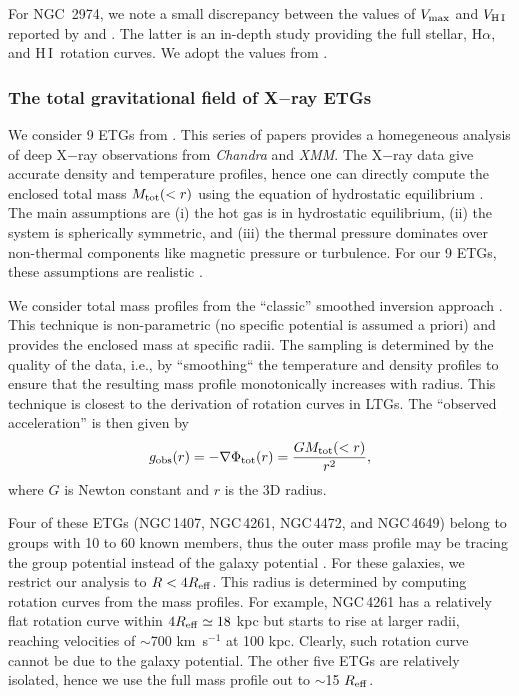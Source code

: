 \documentclass[apjl, twocolappendix]{emulateapj}
\newcommand{\hi } {{\rm H}\,{\small\rm I} \,}
\begin{document}
For NGC~2974, we note a small discrepancy between the values of $V_{\rm max}$ and $V_{\hi}$ reported by \citet{Serra2016} and \citet{Weijmans2008}. The latter is an in-depth study providing the full stellar, H$\alpha$, and \hi rotation curves. We adopt the values from \citet{Weijmans2008}.

\subsubsection{The total gravitational field of X$-$ray ETGs}\label{sec:XrayETGs}

We consider 9 ETGs from \citet{Humphrey2006, Humphrey2008, Humphrey2009, Humphrey2011, Humphrey2012}. This series of papers provides a homegeneous analysis of deep X$-$ray observations from \emph{Chandra} and \emph{XMM}. The X$-$ray data give accurate density and temperature profiles, hence one can directly compute the enclosed total mass $M_{\rm tot}(<r)$ using the equation of hydrostatic equilibrium \citep[see][for a review]{Buote2012}. The main assumptions are (i) the hot gas is in hydrostatic equilibrium, (ii) the system is spherically symmetric, and (iii) the thermal pressure dominates over non-thermal components like magnetic pressure or turbulence. For our 9 ETGs, these assumptions are realistic \citep{Buote2012}. 

We consider total mass profiles from the ``classic'' smoothed inversion approach \citep[see][]{Buote2012}. This technique is non-parametric (no specific potential is assumed a priori) and provides the enclosed mass at specific radii. The sampling is determined by the quality of the data, i.e., by ``smoothing`` the temperature and density profiles to ensure that the resulting mass profile monotonically increases with radius. This technique is closest to the derivation of rotation curves in LTGs. The ``observed acceleration'' is then given by
\begin{equation}\label{Eq:dSph2}
 g_{\rm obs}(r) = -\nabla\Phi_{\rm tot}(r) = \dfrac{G M_{\rm tot}(<r)}{r^2},
\end{equation}
where $G$ is Newton constant and $r$ is the 3D radius.

Four of these ETGs (NGC\,1407, NGC\,4261, NGC\,4472, and NGC\,4649) belong to groups with 10 to 60 known members, thus the outer mass profile may be tracing the group potential instead of the galaxy potential \citep{Humphrey2006}. For these galaxies, we restrict our analysis to $R<4 R_{\rm eff}$. This radius is determined by computing rotation curves from the mass profiles. For example, NGC\,4261 has a relatively flat rotation curve within $4 R_{\rm eff} \simeq 18$ kpc but starts to rise at larger radii, reaching velocities of $\sim$700 km~s$^{-1}$ at 100 kpc. Clearly, such rotation curve cannot be due to the galaxy potential. The other five ETGs are relatively isolated, hence we use the full mass profile out to $\sim$15 $R_{\rm eff}$.
\end{document}
